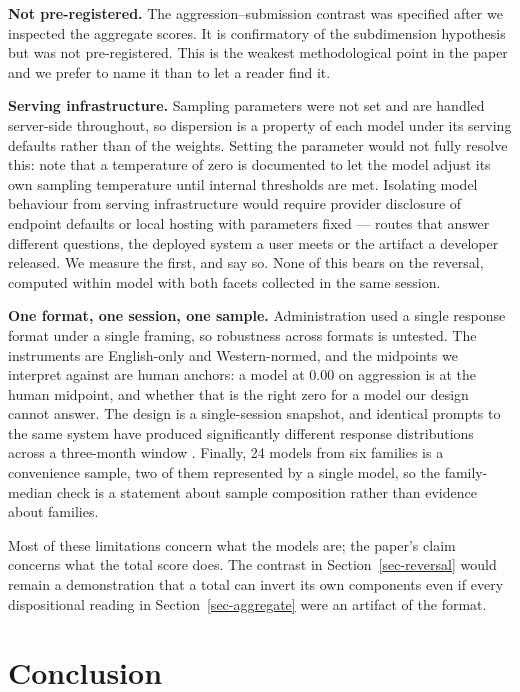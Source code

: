 \documentclass{article}
\begin{document}
\textbf{Not pre-registered.} The aggression--submission contrast was
specified after we inspected the aggregate scores. It is confirmatory of
the subdimension hypothesis but was not pre-registered. This is the
weakest methodological point in the paper and we prefer to name it than
to let a reader find it.

\textbf{Serving infrastructure.} Sampling parameters were not set and
are handled server-side throughout, so dispersion is a property of each
model under its serving defaults rather than of the weights. Setting the
parameter would not fully resolve this: \citet{wang2024} note that a
temperature of zero is documented to let the model adjust its own
sampling temperature until internal thresholds are met. Isolating model
behaviour from serving infrastructure would require provider disclosure
of endpoint defaults or local hosting with parameters fixed --- routes
that answer different questions, the deployed system a user meets or the
artifact a developer released. We measure the first, and say so. None of
this bears on the reversal, computed within model with both facets
collected in the same session.

\textbf{One format, one session, one sample.} Administration used a
single response format under a single framing, so robustness across
formats \citep{rottger2024} is untested. The instruments are
English-only and Western-normed, and the midpoints we interpret against
are human anchors: a model at 0.00 on aggression is at the human
midpoint, and whether that is the right zero for a model our design
cannot answer. The design is a single-session snapshot, and identical
prompts to the same system have produced significantly different
response distributions across a three-month window \citep{bisbee2024}.
Finally, 24 models from six families is a convenience sample, two of
them represented by a single model, so the family-median check is a
statement about sample composition rather than evidence about families.

Most of these limitations concern what the models are; the paper's claim
concerns what the total score does. The contrast in
Section~\ref{sec-reversal} would remain a demonstration that a total can
invert its own components even if every dispositional reading in
Section~\ref{sec-aggregate} were an artifact of the format.

\section{Conclusion}\label{conclusion}
\end{document}
